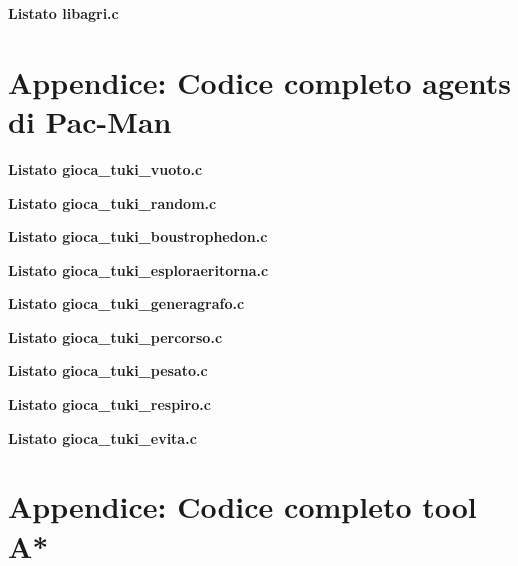 \documentclass[8pt]{book}
\begin{document}
\textbf{Listato libagri.c}



\chapter[Codice agents di Pac-Man]{Appendice: Codice completo agents di Pac-Man}
\textbf{Listato gioca\_tuki\_vuoto.c}


\textbf{Listato gioca\_tuki\_random.c}


\textbf{Listato gioca\_tuki\_boustrophedon.c}


\textbf{Listato gioca\_tuki\_esploraeritorna.c}


\textbf{Listato gioca\_tuki\_generagrafo.c}


\textbf{Listato gioca\_tuki\_percorso.c}


\textbf{Listato gioca\_tuki\_pesato.c}


\textbf{Listato gioca\_tuki\_respiro.c}


\textbf{Listato gioca\_tuki\_evita.c}



\chapter[Codice tool A*]{Appendice: Codice completo tool A*}



\end{document}
